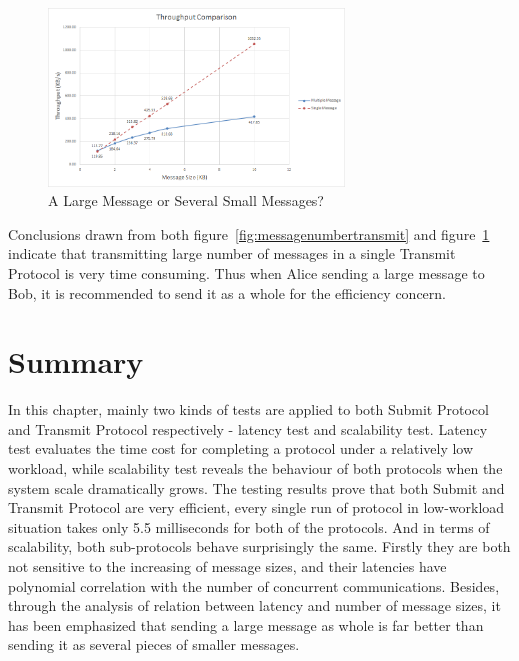 \begin{figure}[h!]
\centering
\includegraphics[width=0.7\textwidth,natwidth=881,natheight=530]{figures/throughputcomparison.png}
\caption{A Large Message or Several Small Messages?}
\label{fig:throughputcomparison}
\end{figure}

Conclusions drawn from both figure~\ref{fig:messagenumbertransmit} and figure~\ref{fig:throughputcomparison} indicate that transmitting large number of messages in a single Transmit Protocol is very time consuming. Thus when Alice sending a large message to Bob, it is recommended to send it as a whole for the efficiency concern.

\section{Summary}
In this chapter, mainly two kinds of tests are applied to both Submit Protocol and Transmit Protocol respectively - latency test and scalability test. Latency test evaluates the time cost for completing a protocol under a relatively low workload, while scalability test reveals the behaviour of both protocols when the system scale dramatically grows. The testing results prove that both Submit and Transmit Protocol are very efficient, every single run of protocol in low-workload situation takes only 5.5 milliseconds for both of the protocols. And in terms of scalability, both sub-protocols behave surprisingly the same. Firstly they are both not sensitive to the increasing of message sizes, and their latencies have polynomial correlation with the number of concurrent communications. Besides, through the analysis of relation between latency and number of message sizes, it has been emphasized that sending a large message as whole is far better than sending it as several pieces of smaller messages.
